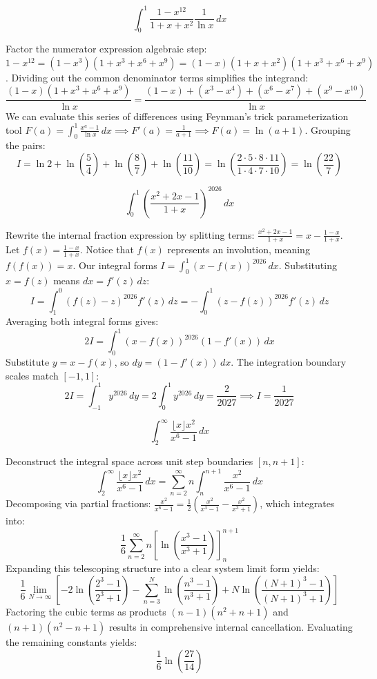\begin{questions}

\question
\[ \int_{0}^{1} \frac{1 - x^{12}}{1 + x + x^2} \frac{1}{\ln x} \,dx \]
\begin{solution}
Factor the numerator expression algebraic step: $1 - x^{12} = (1 - x^3)(1 + x^3 + x^6 + x^9) = (1 - x)(1 + x + x^2)(1 + x^3 + x^6 + x^9)$.
Dividing out the common denominator terms simplifies the integrand:
\[ \frac{(1 - x)(1 + x^3 + x^6 + x^9)}{\ln x} = \frac{(1 - x) + (x^3 - x^4) + (x^6 - x^7) + (x^9 - x^{10})}{\ln x} \]
We can evaluate this series of differences using Feynman's trick parameterization tool $F(a) = \int_{0}^{1} \frac{x^a - 1}{\ln x} \,dx \implies F'(a) = \frac{1}{a+1} \implies F(a) = \ln(a+1)$.
Grouping the pairs:
\[ I = \ln 2 + \ln\left(\frac{5}{4}\right) + \ln\left(\frac{8}{7}\right) + \ln\left(\frac{11}{10}\right) = \ln\left( \frac{2 \cdot 5 \cdot 8 \cdot 11}{1 \cdot 4 \cdot 7 \cdot 10} \right) = \ln\left(\frac{22}{7}\right) \]
\end{solution}

\question
\[ \int_{0}^{1} \left( \frac{x^2 + 2x - 1}{1 + x} \right)^{2026} \,dx \]
\begin{solution}
Rewrite the internal fraction expression by splitting terms: $\frac{x^2 + 2x - 1}{1 + x} = x - \frac{1 - x}{1 + x}$.
Let $f(x) = \frac{1 - x}{1 + x}$. Notice that $f(x)$ represents an involution, meaning $f(f(x)) = x$.
Our integral forms $I = \int_{0}^{1} (x - f(x))^{2026} \,dx$. Substituting $x = f(z)$ means $dx = f'(z) \,dz$:
\[ I = \int_{1}^{0} (f(z) - z)^{2026} f'(z) \,dz = -\int_{0}^{1} (z - f(z))^{2026} f'(z) \,dz \]
Averaging both integral forms gives:
\[ 2I = \int_{0}^{1} (x - f(x))^{2026} (1 - f'(x)) \,dx \]
Substitute $y = x - f(x)$, so $dy = (1 - f'(x)) \,dx$. The integration boundary scales match $[-1, 1]$:
\[ 2I = \int_{-1}^{1} y^{2026} \,dy = 2 \int_{0}^{1} y^{2026} \,dy = \frac{2}{2027} \implies I = \frac{1}{2027} \]
\end{solution}

\question
\[ \int_{2}^{\infty} \frac{\lfloor x \rfloor x^2}{x^6 - 1} \,dx \]
\begin{solution}
Deconstruct the integral space across unit step boundaries $[n, n+1]$:
\[ \int_{2}^{\infty} \frac{\lfloor x \rfloor x^2}{x^6 - 1} \,dx = \sum_{n=2}^{\infty} n \int_{n}^{n+1} \frac{x^2}{x^6 - 1} \,dx \]
Decomposing via partial fractions: $\frac{x^2}{x^6 - 1} = \frac{1}{2} \left( \frac{x^2}{x^3 - 1} - \frac{x^2}{x^3 + 1} \right)$, which integrates into:
\[ \frac{1}{6} \sum_{n=2}^{\infty} n \left[ \ln\left( \frac{x^3 - 1}{x^3 + 1} \right) \right]_{n}^{n+1} \]
Expanding this telescoping structure into a clear system limit form yields:
\[ \frac{1}{6} \lim_{N \to \infty} \left[ -2\ln\left(\frac{2^3-1}{2^3+1}\right) - \sum_{n=3}^{N} \ln\left(\frac{n^3-1}{n^3+1}\right) + N \ln\left(\frac{(N+1)^3-1}{(N+1)^3+1}\right) \right] \]
Factoring the cubic terms as products $(n-1)(n^2+n+1)$ and $(n+1)(n^2-n+1)$ results in comprehensive internal cancellation. Evaluating the remaining constants yields:
\[ \frac{1}{6} \ln\left(\frac{27}{14}\right) \]
\end{solution}

\end{questions}